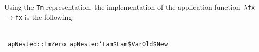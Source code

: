 \documentclass[9pt,authoryear]{sigplanconf}
\begin{document}
%
Using the \texttt{Tm} representation, the implementation of the
    application function{~}\texttt{$ \lambda $}\texttt{\mbox{\hspace{0.50em}}}\texttt{f}\texttt{\mbox{\hspace{0.50em}}}\texttt{x}\texttt{\mbox{\hspace{0.50em}}}\texttt{$ \rightarrow $}\texttt{\mbox{\hspace{0.50em}}}\texttt{f}\texttt{\mbox{\hspace{0.50em}}}\texttt{x} is the following{:}%


{\nopagebreak }

%
%
%
~\\~\vphantom{$\{$}\texttt{apNested}\texttt{\mbox{\hspace{0.50em}}}\texttt{{:}{:}}\texttt{\mbox{\hspace{0.50em}}}\texttt{Tm}\texttt{\mbox{\hspace{0.50em}}}\texttt{Zero}\texttt{{\nopagebreak \newline%
}\vphantom{$\{$}}\texttt{apNested}\texttt{\mbox{\hspace{0.50em}}}\texttt{{\char `\=}}\texttt{\mbox{\hspace{0.50em}}}\texttt{Lam}\texttt{\mbox{\hspace{0.50em}}}\texttt{\${}}\texttt{\mbox{\hspace{0.50em}}}\texttt{Lam}\texttt{\mbox{\hspace{0.50em}}}\texttt{\${}}\texttt{\mbox{\hspace{0.50em}}}\texttt{Var}\texttt{\mbox{\hspace{0.50em}}}\texttt{\makebox[1.22ex][l]{$ {(} $}}\texttt{Old}\texttt{\mbox{\hspace{0.50em}}}\texttt{\${}}\texttt{\mbox{\hspace{0.50em}}}\texttt{New}\texttt{\mbox{\hspace{0.50em}}}\texttt{\makebox[1.22ex][l]{$ {(} $}}\texttt{\makebox[1.22ex][r]{$ {)} $}}\texttt{\makebox[1.22ex][r]{$ {)} $}}\texttt{{\nopagebreak \newline%
}}
\end{document}
